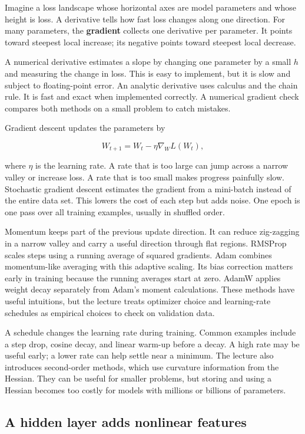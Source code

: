 Imagine a loss landscape whose horizontal axes are model parameters and whose height is loss. A derivative tells how fast loss changes along one direction. For many parameters, the \textbf{gradient} collects one derivative per parameter. It points toward steepest local increase; its negative points toward steepest local decrease.

A numerical derivative estimates a slope by changing one parameter by a small \(h\) and measuring the change in loss. This is easy to implement, but it is slow and subject to floating-point error. An analytic derivative uses calculus and the chain rule. It is fast and exact when implemented correctly. A numerical gradient check compares both methods on a small problem to catch mistakes.

Gradient descent updates the parameters by

\[W_{t+1}=W_t-\eta\nabla_W L(W_t),\]

where \(\eta\) is the learning rate. A rate that is too large can jump across a narrow valley or increase loss. A rate that is too small makes progress painfully slow. Stochastic gradient descent estimates the gradient from a mini-batch instead of the entire data set. This lowers the cost of each step but adds noise. One epoch is one pass over all training examples, usually in shuffled order.

Momentum keeps part of the previous update direction. It can reduce zig-zagging in a narrow valley and carry a useful direction through flat regions. RMSProp scales steps using a running average of squared gradients. Adam combines momentum-like averaging with this adaptive scaling. Its bias correction matters early in training because the running averages start at zero. AdamW applies weight decay separately from Adam's moment calculations. These methods have useful intuitions, but the lecture treats optimizer choice and learning-rate schedules as empirical choices to check on validation data.

A schedule changes the learning rate during training. Common examples include a step drop, cosine decay, and linear warm-up before a decay. A high rate may be useful early; a lower rate can help settle near a minimum. The lecture also introduces second-order methods, which use curvature information from the Hessian. They can be useful for smaller problems, but storing and using a Hessian becomes too costly for models with millions or billions of parameters.

\subsection{A hidden layer adds nonlinear features}\label{04-visual-computing-ii-ch031-a-hidden-layer-adds-nonlinear-features}

